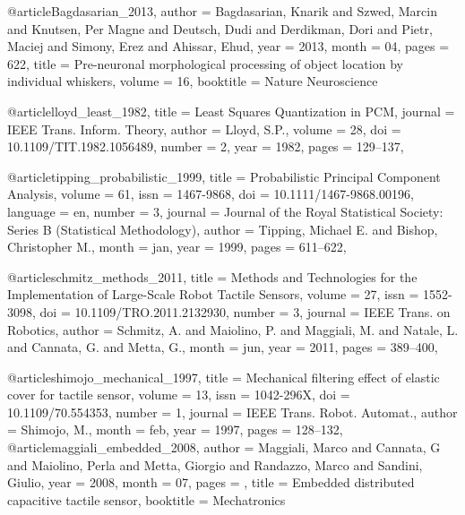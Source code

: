  @article{Bagdasarian_2013,
 	author = {Bagdasarian, Knarik and Szwed, Marcin and Knutsen, Per Magne and Deutsch, Dudi and Derdikman, Dori and Pietr, Maciej and Simony, Erez and Ahissar, Ehud},
 	year = {2013},
 	month = {04},
 	pages = {622},
 	title = {Pre-neuronal morphological processing of object location by individual whiskers},
 	volume = {16},
 	booktitle = {Nature Neuroscience}
 }
 
 
 
 @article{lloyd_least_1982,
 	title = {Least Squares Quantization in PCM},
 	journal = {IEEE Trans. Inform. Theory},
 	author = {Lloyd, S.P.},
 	volume = {28},
 	doi = {10.1109/TIT.1982.1056489},
 	number = {2},
 	year = {1982},
 	pages = {129--137},
 }
 
 @article{tipping_probabilistic_1999,
 	title = {Probabilistic Principal Component Analysis},
 	volume = {61},
 	issn = {1467-9868},
 	doi = {10.1111/1467-9868.00196},
 	language = {en},
 	number = {3},
 	journal = {Journal of the Royal Statistical Society: Series B (Statistical Methodology)},
 	author = {Tipping, Michael E. and Bishop, Christopher M.},
 	month = jan,
 	year = {1999},
 	pages = {611--622},
 }
 
 
 
 
 @article{schmitz_methods_2011,
	title = {Methods and {Technologies} for the {Implementation} of {Large}-{Scale} {Robot} {Tactile} {Sensors}},
	volume = {27},
	issn = {1552-3098},
	doi = {10.1109/TRO.2011.2132930},
	number = {3},
	journal = {IEEE Trans. on Robotics},
	author = {Schmitz, A. and Maiolino, P. and Maggiali, M. and Natale, L. and Cannata, G. and Metta, G.},
	month = jun,
	year = {2011},
	pages = {389--400},
}
 
 
 @article{shimojo_mechanical_1997,
 	title = {Mechanical filtering effect of elastic cover for tactile sensor},
 	volume = {13},
 	issn = {1042-296X},
 	doi = {10.1109/70.554353},
 	number = {1},
 	journal = {IEEE Trans. Robot. Automat.},
 	author = {Shimojo, M.},
 	month = feb,
 	year = {1997},
 	pages = {128--132},
 }
 @article{maggiali_embedded_2008,
 	author = {Maggiali, Marco and Cannata, G and Maiolino, Perla and Metta, Giorgio and Randazzo, Marco and Sandini, Giulio},
 	year = {2008},
 	month = {07},
 	pages = {},
 	title = {Embedded distributed capacitive tactile sensor},
 	booktitle = {Mechatronics}
 }


